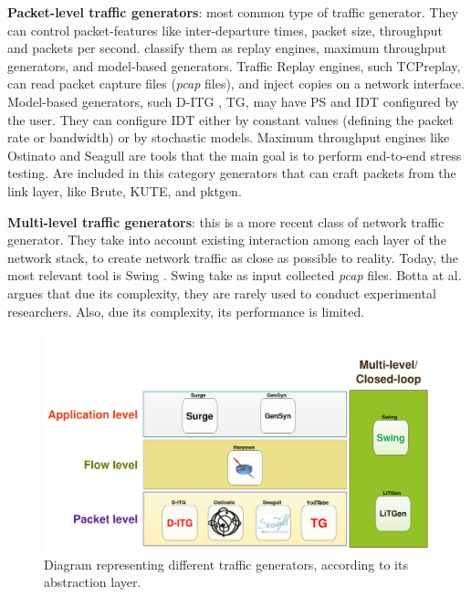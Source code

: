 \textbf{Packet-level traffic generators}: most common type of traffic generator. They can control packet-features like inter-departure times, packet size, throughput and packets per second\cite{validate-trafficgen}. \cite{validate-trafficgen} classify them as replay engines, maximum throughput generators, and model-based generators. Traffic Replay engines, such TCPreplay\cite{web-tcpreplay}, can read packet capture files (\textit{pcap} files), and inject copies on a network interface. Model-based generators, such D-ITG \cite{ditg-paper}, TG\cite{web-tg}, may have PS and IDT configured by the user. They can configure IDT  either by constant values (defining the packet rate or bandwidth) or by stochastic models. Maximum throughput engines like Ostinato and Seagull are tools that the main goal is to perform end-to-end stress testing. Are included in this category generators that can craft packets from the link layer, like Brute, KUTE, and pktgen.

\textbf{Multi-level traffic generators}: this is a more recent class of network traffic generator. They take into account existing interaction among each layer of the network stack, to create network traffic as close as possible to reality. Today, the most relevant tool is Swing \cite{swing-paper}. Swing take as input collected \textit{pcap} files. Botta at al. \cite{do-you-trust} argues that due its complexity, they are rarely used to conduct experimental researchers. Also, due its complexity, its performance is limited\cite{legotg-paper}. 



\begin{figure}[!ht]
	\centering
	\includegraphics[scale=0.4]{figures/ch2/types-workload-tools}
	\caption{Diagram representing different traffic generators, according to its abstraction layer.}
	\label{fig:layers-workload-tools}
\end{figure}


